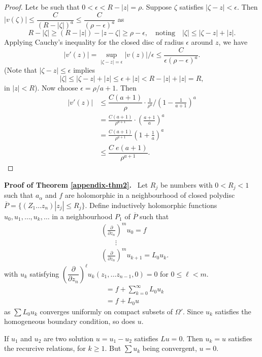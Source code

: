 \begin{proof}
Let\pageoriginale $\epsilon$ be such that $0<\epsilon <R-|z|=\rho$. Suppose $\zeta$ satisfies $|\zeta-z|<\epsilon$. Then $|v(\zeta)|\leq \dfrac{C}{(R-|\zeta|)^{a}}\leq \dfrac{C}{(\rho-\epsilon)^{a}}$ as
$$
R-|\zeta|\geq (R-|z|)-|z-\zeta|\geq \rho -\epsilon,\quad\text{noting}\quad |\zeta|\leq |\zeta-z|+|z|.
$$
Applying Cauchy's inequality for the closed disc of radius $\epsilon$ around $z$, we have
$$
|v'(z)|=\sup\limits_{|\zeta-z|=\epsilon}|v(z)|/\epsilon \leq \dfrac{C}{\epsilon(\rho-\epsilon)^{a}}.
$$
(Note that $|\zeta-z|\leq \epsilon$ implies
$$
|\zeta|\leq |\zeta-z|+|z|\leq \epsilon + |z|<R-|z|+|z|=R,
$$
in $|z|<R$). Now choose $\epsilon=\rho/a+1$. Then
\begin{align*}
|v'(z)| &\leq \dfrac{C(a+1)}{\rho}\cdot \frac{1}{\rho^{a}}/\left(1-\frac{1}{a+1}\right)^{a}\\[4pt]
&= \frac{C(a+1)}{\rho^{a+1}}\cdot \left(\frac{a+1}{a}\right)^{a}\\[4pt]
&= \frac{C(a+1)}{\rho^{a+1}}\left(1+\frac{1}{a}\right)^{a}\\[4pt]
&\leq \dfrac{C\; e(a+1)}{\rho^{a+1}}.
\end{align*}
\end{proof}

\noindent
{\bf Proof of Theorem \ref{appendix-thm2}.}~
Let $R_{j}$ be numbers with $0<R_{j}<1$ such that $a_{\alpha}$ and $f$ are holomorphic in a neighbourhood of closed polydisc $\overline{P}=\{(Z_{1}\ldots z_{n})|z_{j}|\leq R_{j}\}$. Define inductively holomorphic functions $u_{0},u_{1},\ldots,u_{k},\ldots$ in a neighbourhood $P_{1}$ of $\overline{P}$ such that 
\begin{align*}
& \left(\frac{\partial}{\partial z_{n}}\right)^{m}u_{0}=f\\[2pt]
&\qquad \vdots\\[2pt]
&\left(\frac{\partial}{\partial z_{n}}\right)^{m}u_{k+1}=L_{0}u_{k}.
\end{align*}
with $u_{k}$ satisfying $\left(\dfrac{\partial}{\partial z_{n}}\right)^{\ell}u_{k}(z_{1},\ldots z_{n-1},0)=0$ for $0\leq \ell <m$.
\begin{align*}
&= f+\sum\limits^{\infty}_{k=0}L_{0}u_{k}\\[3pt]
&= f+L_{0}u
\end{align*}\pageoriginale 
as $\sum L_{0}u_{k}$ converges uniformly on compact subsets of $\Omega'$. Since $u_{k}$ satisfies the homogeneous boundary condition, so does $u$.

If $u_{1}$ and $u_{2}$ are two solution $u=u_{1}-u_{2}$ satisfies $Lu=0$. Then $u_{k}=u$ satisfies the recurcive relations, for $k\geq 1$. But $\sum u_{k}$ being convergent, $u=0$.
